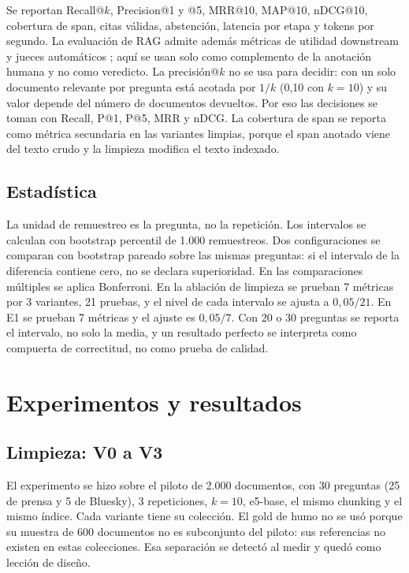 \documentclass[11pt]{tg_usta}
\begin{document}
Se reportan Recall@$k$, Precision@1 y @5, MRR@10, MAP@10, nDCG@10, cobertura de span, citas válidas, abstención, latencia por etapa y tokens por segundo. La evaluación de RAG admite además métricas de utilidad downstream y jueces automáticos \cite{salemi2024erag,es2023ragas,saadfalcon2024ares,ru2024ragchecker}; aquí se usan solo como complemento de la anotación humana y no como veredicto. La precisión@$k$ no se usa para decidir: con un solo documento relevante por pregunta está acotada por $1/k$ (0,10 con $k=10$) y su valor depende del número de documentos devueltos. Por eso las decisiones se toman con Recall, P@1, P@5, MRR y nDCG. La cobertura de span se reporta como métrica secundaria en las variantes limpias, porque el span anotado viene del texto crudo y la limpieza modifica el texto indexado.

\subsection{Estadística}

La unidad de remuestreo es la pregunta, no la repetición. Los intervalos se calculan con bootstrap percentil de 1.000 remuestreos. Dos configuraciones se comparan con bootstrap pareado sobre las mismas preguntas: si el intervalo de la diferencia contiene cero, no se declara superioridad. En las comparaciones múltiples se aplica Bonferroni. En la ablación de limpieza se prueban 7 métricas por 3 variantes, 21 pruebas, y el nivel de cada intervalo se ajusta a $0,05/21$. En E1 se prueban 7 métricas y el ajuste es $0,05/7$. Con 20 o 30 preguntas se reporta el intervalo, no solo la media, y un resultado perfecto se interpreta como compuerta de correctitud, no como prueba de calidad.

\section{Experimentos y resultados}

\subsection{Limpieza: V0 a V3}
\label{sec:limpieza}

El experimento se hizo sobre el piloto de 2.000 documentos, con 30 preguntas (25 de prensa y 5 de Bluesky), 3 repeticiones, $k=10$, e5-base, el mismo chunking y el mismo índice. Cada variante tiene su colección. El gold de humo no se usó porque su muestra de 600 documentos no es subconjunto del piloto: sus referencias no existen en estas colecciones. Esa separación se detectó al medir y quedó como lección de diseño.
\end{document}
